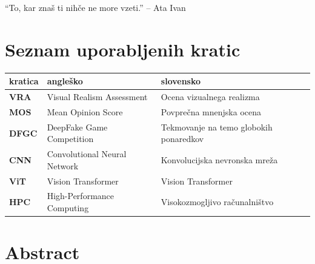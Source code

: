 \documentclass[a4paper,12pt,openright]{book}
\newcommand{\clearemptydoublepage}{\newpage{\pagestyle{empty}\cleardoublepage}}
\begin{document}
\clearemptydoublepage

\thispagestyle{empty}\mbox{}{\textheight}\mbox{}\hfill\begin{minipage}{0.50\textwidth}%
``To, kar znaš ti nihče ne more vzeti.'' -- Ata Ivan

\normalfont\end{minipage}

\clearemptydoublepage

\pagestyle{empty}
\def\thepage{}%
\tableofcontents{}


\clearemptydoublepage

\chapter*{Seznam uporabljenih kratic}

\noindent\begin{tabular}{p{}|p{}|p{}}
  {\bf kratica} & {\bf angleško}                              & {\bf slovensko} \\ \hline
  {\bf VRA}     & Visual Realism Assessment      & Ocena vizualnega realizma\\
  \hline
  {\bf MOS}     & Mean Opinion Score                           & Povprečna mnenjska ocena \\
  \hline
  {\bf DFGC}    & DeepFake Game Competition                & 
Tekmovanje na temo globokih ponaredkov \\
  \hline
  {\bf CNN}     & Convolutional Neural Network                 & Konvolucijska nevronska mreža \\
  \hline
  {\bf ViT}     & Vision Transformer                           & Vision Transformer \\
  \hline
  {\bf HPC}     & High-Performance Computing                   & Visokozmogljivo računalništvo \\
\end{tabular}



\clearemptydoublepage
{}
\chapter*{Abstract}
\end{document}
